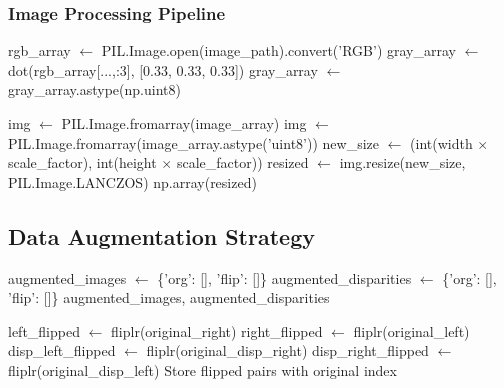 \documentclass[12pt]{article}
\begin{document}
\subsubsection{Image Processing Pipeline}
\begin{algorithm}[H]
\caption{Image Loading and Processing}
\begin{algorithmic}[1]
\State rgb\_array $\gets$ PIL.Image.open(image\_path).convert('RGB')
\State gray\_array $\gets$ dot(rgb\_array[...,:3], [0.33, 0.33, 0.33])
\State {}
    \State gray\_array $\gets$ 
\EndIf
\State \Return gray\_array.astype(np.uint8)
\EndFunction

\State {} 
    \State img $\gets$ PIL.Image.fromarray(image\_array)
\Else {}
    \State img $\gets$ PIL.Image.fromarray(image\_array.astype('uint8'))
\EndIf
\State new\_size $\gets$ (int(width $\times$ scale\_factor), int(height $\times$ scale\_factor))
\State resized $\gets$ img.resize(new\_size, PIL.Image.LANCZOS)
\State \Return np.array(resized)
\EndFunction
\end{algorithmic}
\end{algorithm}

\subsection{Data Augmentation Strategy}

\begin{algorithm}[H]
\caption{Data Augmentation through Flipping}
\begin{algorithmic}[1]
\State augmented\_images $\gets$ \{'org': [], 'flip': []\}
\State augmented\_disparities $\gets$ \{'org': [], 'flip': []\}
\State {}
    \State {}
    \State {}
\EndFor
\State \Return augmented\_images, augmented\_disparities
\EndProcedure

\State left\_flipped $\gets$ fliplr(original\_right)
\State right\_flipped $\gets$ fliplr(original\_left)
\State disp\_left\_flipped $\gets$ fliplr(original\_disp\_right)  
\State disp\_right\_flipped $\gets$ fliplr(original\_disp\_left)
\State Store flipped pairs with original index
\EndFunction
\end{algorithmic}
\end{algorithm}
\end{document}
